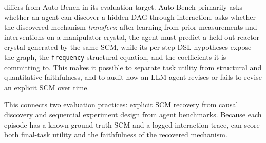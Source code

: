 \projectname{} differs from Auto-Bench in its evaluation target. Auto-Bench primarily asks whether an agent can discover a hidden DAG through interaction. \projectname{} asks whether the discovered mechanism \emph{transfers}: after learning from prior measurements and interventions on a manipulator crystal, the agent must predict a held-out reactor crystal generated by the same SCM, while its per-step DSL hypotheses expose the graph, the \texttt{frequency} structural equation, and the coefficients it is committing to. This makes it possible to separate task utility from structural and quantitative faithfulness, and to audit how an LLM agent revises or fails to revise an explicit SCM over time.

This connects two evaluation practices: explicit SCM recovery from causal discovery and sequential experiment design from agent benchmarks. Because each episode has a known ground-truth SCM and a logged interaction trace, \projectname{} can score both final-task utility and the faithfulness of the recovered mechanism.

